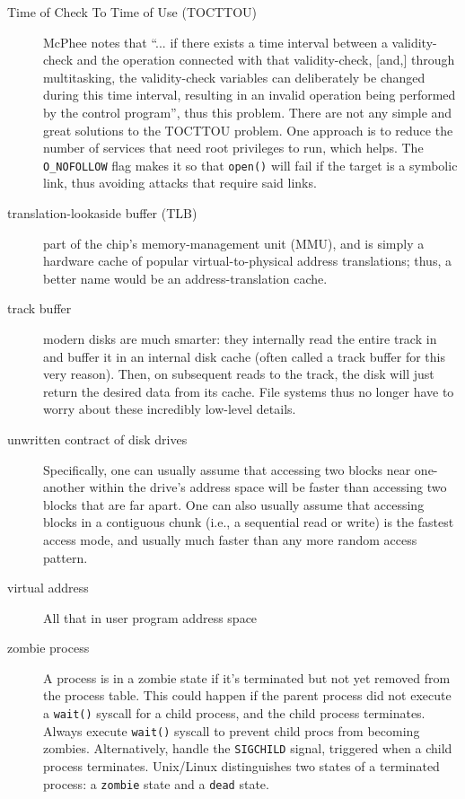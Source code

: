 \begin{description}
\item[Time of Check To Time of Use (TOCTTOU)] McPhee notes that ``... if there exists a time interval between a validity-check and the operation connected with that validity-check, [and,] through multitasking, the validity-check variables can deliberately be changed during this time interval, resulting in an invalid operation being performed by the control program'', thus this problem.  There are not any simple and great solutions to the TOCTTOU problem. One approach is to reduce the number of services that need root privileges to run, which helps. The \texttt{O\_NOFOLLOW} flag makes it so that \texttt{open()} will fail if the target is a symbolic link, thus avoiding attacks that require said links.

\item[translation-lookaside buffer (TLB)] part of the chip’s memory-management unit (MMU), and is simply a hardware cache of popular virtual-to-physical address translations; thus, a better name would be an address-translation cache.

\item[track buffer] modern disks are much smarter: they internally read the entire track in and buffer it in an internal disk cache (often called a track buffer for this very reason). Then, on subsequent reads to the track, the disk will just return the desired data from its cache. File systems thus no longer have to worry about these incredibly low-level details.


\item[unwritten contract of disk drives] Specifically, one can usually assume that accessing two blocks near one-another within the drive’s address space will be faster than accessing two blocks that are far apart. One can also usually assume that accessing blocks in a contiguous chunk (i.e., a sequential read or write) is the fastest access mode, and usually much faster than any more random access pattern.

\item[virtual address] All that in user program address space

\item[zombie process] A process is in a zombie state if it’s terminated but not yet removed from the process table. This could happen if the parent process did not execute a \texttt{wait()} syscall for a child process, and the child process terminates. Always execute \texttt{wait()} syscall to prevent child procs from becoming zombies. Alternatively, handle the \texttt{SIGCHILD} signal, triggered when a child process terminates.  Unix/Linux distinguishes two states of a terminated process: a \texttt{zombie} state and a \texttt{dead} state.
\end{description}


